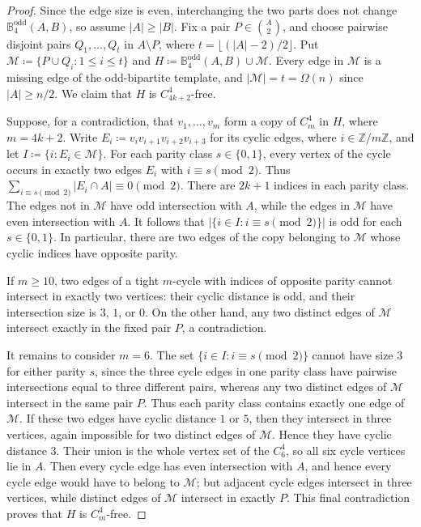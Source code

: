 \documentclass[10pt,a4paper]{article}
\theoremstyle{plain}
\theoremstyle{definition}
\begin{document}
\begin{proof}
Since the edge size is even, interchanging the two parts does not change $\mathbb{B}_{4}^{\mathrm{odd}}(A,B)$, so assume $|A|\ge |B|$.
Fix a pair $P\in\binom A2$, and choose pairwise disjoint pairs
$Q_1,\ldots,Q_t$ in $A\setminus P$, where $t=\lfloor(|A|-2)/2\rfloor$.
Put $\mathcal M\coloneqq\{P\cup Q_i:1\le i\le t\}$ and $H\coloneqq\mathbb{B}_{4}^{\mathrm{odd}}(A,B)\cup\mathcal M$.
Every edge in $\mathcal M$ is a missing edge of the odd-bipartite template, and $|\mathcal M|=t=\Omega(n)$ since $|A|\ge n/2$.
We claim that $H$ is $C_{4k+2}^{4}$-free.

Suppose, for a contradiction, that $v_1,\ldots,v_m$ form a copy of $C_m^4$ in $H$, where $m=4k+2$.
Write $E_i\coloneqq v_iv_{i+1}v_{i+2}v_{i+3}$ for its cyclic edges, where $i\in\mathbb Z/m\mathbb Z$, and let $I\coloneqq\{i:E_i\in\mathcal M\}$.
For each parity class $s\in\{0,1\}$, every vertex of the cycle occurs in exactly two edges $E_i$ with $i\equiv s\pmod2$.
Thus $\sum_{i\equiv s\pmod2}|E_i\cap A|\equiv0\pmod2$.
There are $2k+1$ indices in each parity class.
The edges not in $\mathcal M$ have odd intersection with $A$, while the edges in $\mathcal M$ have even intersection with $A$.
It follows that $|\{i\in I:i\equiv s\pmod2\}|$ is odd for each $s\in\{0,1\}$.
In particular, there are two edges of the copy belonging to $\mathcal M$ whose cyclic indices have opposite parity.

If $m\ge10$, two edges of a tight $m$-cycle with indices of opposite parity cannot intersect in exactly two vertices: their cyclic distance is odd, and their intersection size is $3$, $1$, or $0$.
On the other hand, any two distinct edges of $\mathcal M$ intersect exactly in the fixed pair $P$, a contradiction.

It remains to consider $m=6$.
The set $\{i\in I:i\equiv s\pmod2\}$ cannot have size $3$ for either parity $s$, since the three cycle edges in one parity class have pairwise intersections equal to three different pairs, whereas any two distinct edges of $\mathcal M$ intersect in the same pair $P$.
Thus each parity class contains exactly one edge of $\mathcal M$.
If these two edges have cyclic distance $1$ or $5$, then they intersect in three vertices, again impossible for two distinct edges of $\mathcal M$.
Hence they have cyclic distance $3$.
Their union is the whole vertex set of the $C_6^4$, so all six cycle vertices lie in $A$.
Then every cycle edge has even intersection with $A$, and hence every cycle edge would have to belong to $\mathcal M$; but adjacent cycle edges intersect in three vertices, while distinct edges of $\mathcal M$ intersect in exactly $P$.
This final contradiction proves that $H$ is $C_m^4$-free.
\end{proof}
\end{document}
